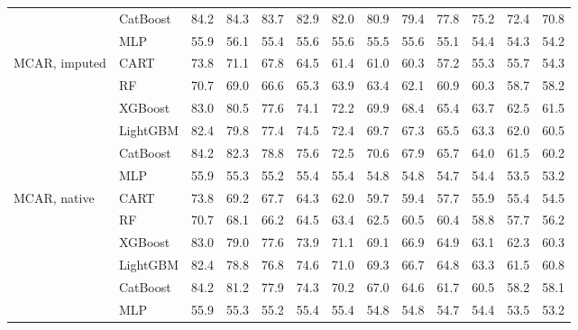 \documentclass[pdflatex,sn-mathphys]{sn-jnl}
\theoremstyle{thmstyleone}
\begin{document}
\begin{table}[htbp]
\begin{tabular}{@{}llrrrrrrrrrrr@{}}
 & CatBoost & 84.2 & 84.3 & 83.7 & 82.9 & 82.0 & 80.9 & 79.4 & 77.8 & 75.2 & 72.4 & 70.8 \\
 & MLP & 55.9 & 56.1 & 55.4 & 55.6 & 55.6 & 55.5 & 55.6 & 55.1 & 54.4 & 54.3 & 54.2 \\
\midrule
MCAR, imputed & CART & 73.8 & 71.1 & 67.8 & 64.5 & 61.4 & 61.0 & 60.3 & 57.2 & 55.3 & 55.7 & 54.3 \\
 & RF & 70.7 & 69.0 & 66.6 & 65.3 & 63.9 & 63.4 & 62.1 & 60.9 & 60.3 & 58.7 & 58.2 \\
 & XGBoost & 83.0 & 80.5 & 77.6 & 74.1 & 72.2 & 69.9 & 68.4 & 65.4 & 63.7 & 62.5 & 61.5 \\
 & LightGBM & 82.4 & 79.8 & 77.4 & 74.5 & 72.4 & 69.7 & 67.3 & 65.5 & 63.3 & 62.0 & 60.5 \\
 & CatBoost & 84.2 & 82.3 & 78.8 & 75.6 & 72.5 & 70.6 & 67.9 & 65.7 & 64.0 & 61.5 & 60.2 \\
 & MLP & 55.9 & 55.3 & 55.2 & 55.4 & 55.4 & 54.8 & 54.8 & 54.7 & 54.4 & 53.5 & 53.2 \\
\midrule
MCAR, native & CART & 73.8 & 69.2 & 67.7 & 64.3 & 62.0 & 59.7 & 59.4 & 57.7 & 55.9 & 55.4 & 54.5 \\
 & RF & 70.7 & 68.1 & 66.2 & 64.5 & 63.4 & 62.5 & 60.5 & 60.4 & 58.8 & 57.7 & 56.2 \\
 & XGBoost & 83.0 & 79.0 & 77.6 & 73.9 & 71.1 & 69.1 & 66.9 & 64.9 & 63.1 & 62.3 & 60.3 \\
 & LightGBM & 82.4 & 78.8 & 76.8 & 74.6 & 71.0 & 69.3 & 66.7 & 64.8 & 63.3 & 61.5 & 60.8 \\
 & CatBoost & 84.2 & 81.2 & 77.9 & 74.3 & 70.2 & 67.0 & 64.6 & 61.7 & 60.5 & 58.2 & 58.1 \\
 & MLP & 55.9 & 55.3 & 55.2 & 55.4 & 55.4 & 54.8 & 54.8 & 54.7 & 54.4 & 53.5 & 53.2 \\
\bottomrule
\end{tabular}
\end{table}
\end{document}

